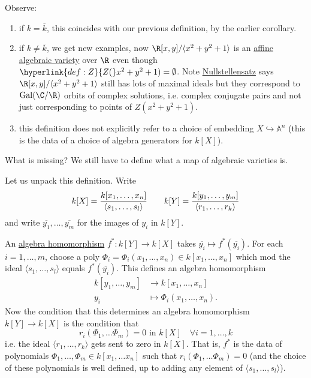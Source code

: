 \documentclass{article}
\newcommand{\A}{\mathbb{A}}
\DeclareMathOperator{\Mor}{Mor}
\DeclareMathOperator{\Gal}{Gal}
\begin{document}
Observe:
\begin{enumerate}[label=(\roman*)]
    \item if $k = \overline{k}$, this coincides with our previous definition, by the earlier corollary.
    \item if $k \neq \overline{k}$, we get new examples, now $\R[x,y]/\langle x^2 + y^2 + 1 \rangle$ is an \hyperlink{def:affineVariety}{affine algebraic variety} over $\R$ even though $\hyperlink{def:Z}{Z(}x^2 + y^2 + 1) = \emptyset$.
        Note \hyperlink{def:null1}{Nullstellensatz} says $\R[x,y]/\langle x^2 + y^2 + 1 \rangle$ still has lots of maximal ideals but they correspond to $\Gal(\C/\R)$ orbits of complex solutions, i.e. complex conjugate pairs and not just corresponding to points of $Z(x^2 + y^2 + 1)$.
    \item this definition does not explicitly refer to a choice of embedding $X \hookrightarrow \A^n$ (this is the data of a choice of algebra generators for $k[X]$).
\end{enumerate}
What is missing? We still have to define what a map of algebraic varieties is.
Let us unpack this definition.
Write
\begin{equation*}
    k[X] = \frac{k[x_1, \dotsc, x_n]}{\langle s_1, \dotsc, s_l \rangle} \qquad k[Y] = {k[y_1, \dotsc, y_m] \over \langle r_1, \dotsc, r_k \rangle}
\end{equation*}
and write $\overline{y_1}, \dotsc, \overline{y_m}$ for the images of $y_i$ in $k[Y]$.

An \hyperlink{def:algHom}{algebra homomorphism} $f^*: k[Y] \to k[X]$ takes $\overline{y_i} \mapsto f^*(\overline{y_i})$.
For each $i=1,\dotsc,m$, choose a poly $\Phi_i = \Phi_i(x_1, \dotsc, x_n) \in k[x_1, \dotsc, x_n]$ which mod the ideal $\langle s_1, \dotsc, s_l \rangle$ equals $f^*(\overline{y_i})$.
This defines an algebra homomorphism
\begin{align*}
    k[y_1, \dotsc, y_m] &\longrightarrow k[x_1, \dotsc, x_n] \\
    y_i &\longmapsto \Phi_i(x_1, \dotsc, x_n).
\end{align*}
Now the condition that this determines an algebra homomorphism $k[Y] \to k[X]$ is the condition that
\begin{equation*}r_i(\Phi_1, \dotsc \Phi_m) = 0 \text{ in } k[X] \quad \forall i=1,\dotsc,k\end{equation*}
i.e. the ideal $\langle r_1, \dotsc, r_k\rangle$ gets sent to zero in $k[X]$.
That is, $f^*$ is the data of polynomials $\Phi_1, \dotsc, \Phi_m \in k[x_1, \dotsc x_n]$ such that $r_i(\Phi_1, \dotsc \Phi_m) = 0$ (and the choice of these polynomials is well defined, up to adding any element of $\langle s_1, \dotsc, s_l\rangle$).
\end{document}

